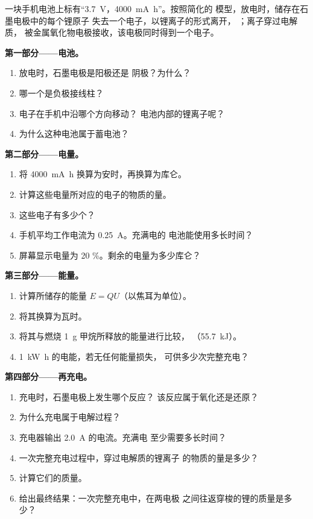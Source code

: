 \begin{problem}
\label{pb:g12:cells-and-electrolysis:1}
一块手机电池上标有“\qty{3.7}{V}，\qty{4000}{mA.h}”。按照简化的
模型，放电时，储存在石墨电极中的每个锂原子
失去一个电子，以锂离子的形式离开，
；离子穿过电解质，
被金属氧化物电极接收，该电极同时得到一个电子。

\medskip
\noindent\textbf{第一部分——电池。}
\begin{enumerate}
  \item 放电时，石墨电极是阳极还是
        阴极？为什么？
  \item 哪一个是负极接线柱？
  \item 电子在手机中沿哪个方向移动？
        电池内部的锂离子呢？
  \item 为什么这种电池属于蓄电池？
\end{enumerate}

\medskip
\noindent\textbf{第二部分——电量。}
\begin{enumerate}[resume]
  \item 将 \qty{4000}{mA.h} 换算为安时，再换算为库仑。
  \item 计算这些电量所对应的电子的物质的量。
  \item 这些电子有多少个？
  \item 手机平均工作电流为 \qty{0.25}{A}。充满电的
        电池能使用多长时间？
  \item 屏幕显示电量为 20 \%。剩余的电量为多少库仑？
\end{enumerate}

\medskip
\noindent\textbf{第三部分——能量。}
\begin{enumerate}[resume]
  \item 计算所储存的能量 $E = Q U$（以焦耳为单位）。
  \item 将其换算为瓦时。
  \item 将其与燃烧 \qty{1}{g} 甲烷所释放的能量进行比较，
        （\qty{55.7}{kJ}）。
  \item \qty{1}{kW.h} 的电能，若无任何能量损失，
        可供多少次完整充电？
\end{enumerate}

\medskip
\noindent\textbf{第四部分——再充电。}
\begin{enumerate}[resume]
  \item 充电时，石墨电极上发生哪个反应？
        该反应属于氧化还是还原？
  \item 为什么充电属于电解过程？
  \item 充电器输出 \qty{2.0}{A} 的电流。充满电
        至少需要多长时间？
  \item 一次完整充电过程中，穿过电解质的锂离子
        的物质的量是多少？
  \item 计算它们的质量。
  \item 给出最终结果：一次完整充电中，在两电极
        之间往返穿梭的锂的质量是多少？
\end{enumerate}
\end{problem}
